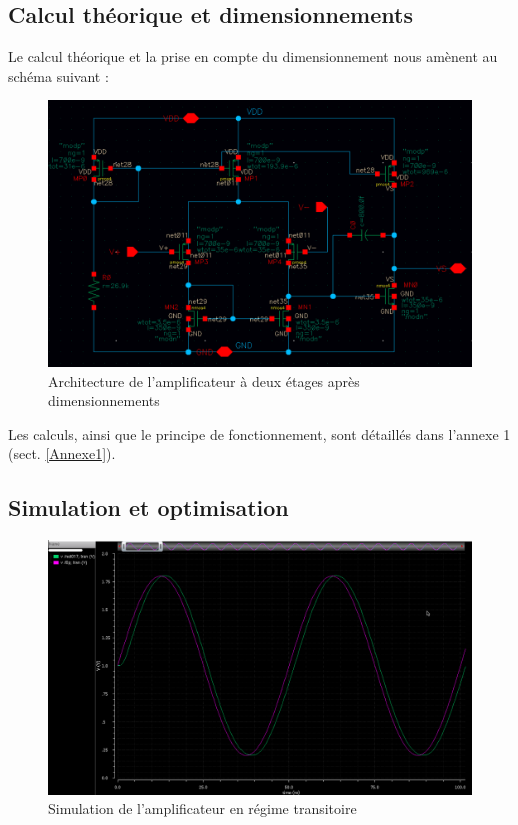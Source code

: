 \documentclass[11pt]{article}
\begin{document}
\subsection{Calcul th\'eorique et dimensionnements}

Le calcul th\'eorique et la prise en compte du dimensionnement nous am\`enent au sch\'ema
suivant :

\begin{figure}[!htb]
\begin{center}
  \includegraphics[width=\linewidth]{amplificateur_.png}
  \caption{Architecture de l'amplificateur \`a deux \'etages apr\`es dimensionnements}
\end{center}
\end{figure}

Les calculs, ainsi que le principe de fonctionnement, sont d\'etaill\'es dans l'annexe 1 (sect. \ref{Annexe1}). 
 
\clearpage

\subsection{Simulation et optimisation}

\begin{figure}[!htb]
\begin{center}
  \includegraphics[width=0.85\linewidth]{reponse_ampli.png}
  \caption{Simulation de l'amplificateur en r\'egime transitoire}
  \label{fig:figSimAmp}
\end{center}
\end{figure}
\end{document}
